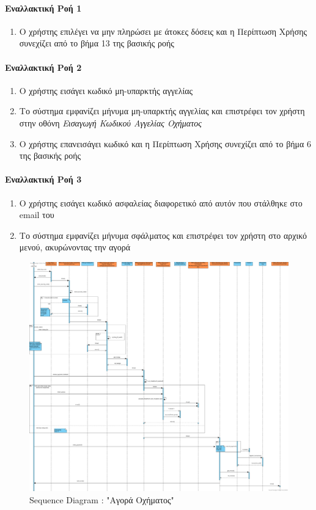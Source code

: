 \documentclass{../ol-softwaremanual}
\begin{document}
	\paragraph{Εναλλακτική Ροή 1}
	\begin{enumerate}
		\item Ο χρήστης επιλέγει να μην πληρώσει με άτοκες δόσεις και η Περίπτωση Χρήσης συνεχίζει από το βήμα 13 της βασικής ροής
	\end{enumerate}
	
	\paragraph{Εναλλακτική Ροή 2}
	\begin{enumerate}
		\item Ο χρήστης εισάγει κωδικό μη-υπαρκτής αγγελίας
		\item Το σύστημα εμφανίζει μήνυμα μη-υπαρκτής αγγελίας και επιστρέφει τον χρήστη στην οθόνη \textit{Εισαγωγή Κωδικού Αγγελίας Οχήματος} 
		\item Ο χρήστης επανεισάγει κωδικό και η Περίπτωση Χρήσης συνεχίζει από το βήμα 6 της βασικής ροής
	\end{enumerate}
	
	\paragraph{Εναλλακτική Ροή 3}
	\begin{enumerate}
		\item Ο χρήστης εισάγει κωδικό ασφαλείας διαφορετικό από αυτόν που στάλθηκε στο \en email \gr του
		\item Το σύστημα εμφανίζει μήνυμα σφάλματος και επιστρέφει τον χρήστη στο αρχικό μενού, ακυρώνοντας την αγορά
	\end{enumerate}
	
	
	\begin{figure}[htbp!]
		\centering
		\includegraphics[scale=0.19]{img/seq_buy_car.png}
		\caption{\en Sequence Diagram : "\gr Αγορά Οχήματος\en"\gr}
	\end{figure}
	
\end{document}
